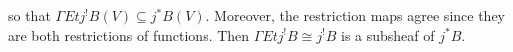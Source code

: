 so that  $\Gamma Et j^!B(V) \subseteq j^*B(V)$. Moreover, the restriction maps agree since they are both restrictions of functions. Then  $\Gamma Et j^!B \cong j^!B$ is a subsheaf of $j^*B$.





